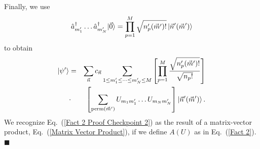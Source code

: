 \documentclass[aps,pra,twocolumn,superscriptaddress,floatfix,10pt]{revtex4}
\begin{document}
Finally, we use 
\begin{equation}
\hat{a}_{m_1^\prime}^\dagger \dots \hat{a}_{m_N^\prime}^\dagger |\vec{0} \rangle =  \prod_{p=1}^{M} \sqrt{ n_p^\prime(\vec{m}^\prime)! } \ket{\vec{n}^\prime(\vec{m}^\prime)} 
\end{equation}
 to obtain
\begin{eqnarray}
\label{Fact 2 Proof Checkpoint 2}
\small \ket{\psi^\prime} &=& \sum_{\vec{n}} c_{\vec{n}}   \sum_{1 \le m_1^\prime \le \cdots \le m_N^\prime \le M}
\left[ \prod_{p=1}^{M} \frac{\sqrt{n_p^\prime(\vec{m}^\prime) !}}{ \sqrt{n_p !}} \right] \\  \nonumber &\cdot&  \left[ \sum_{\textrm{perm}(\vec{m}^\prime)} U_{m_1 m_1^\prime} \dots U_{m_N m_N^\prime} \right] 
 \ket{\vec{n}^\prime (\vec{m}^\prime) } .
\end{eqnarray}
We recognize Eq.~(\ref{Fact 2 Proof Checkpoint 2}) as the result of a matrix-vector product, Eq.~(\ref{Matrix Vector Product}), if we define $A(U)$ as in Eq.~(\ref{Fact 2}).  $ \blacksquare $
\end{document}
